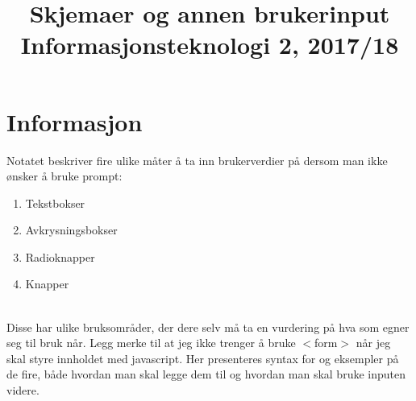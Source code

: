 \documentclass[a4paper, norsk, 10pt]{article}
\title{\bfseries \huge Skjemaer og annen brukerinput \\ Informasjonsteknologi 2, 2017/18}
\date{}
\author{}
\begin{document}
\thispagestyle{fancy}
\maketitle

\section*{Informasjon}
Notatet beskriver fire ulike måter å ta inn brukerverdier på dersom man ikke ønsker å bruke prompt:
\begin{enumerate}
\item Tekstbokser
\item Avkrysningsbokser
\item Radioknapper
\item Knapper
\end{enumerate} 
\ \\
Disse har ulike  bruksområder, der dere selv må ta en vurdering på hva som egner seg til bruk når. Legg merke til at jeg ikke trenger å bruke $<$form$>$ når jeg skal styre innholdet med javascript. Her presenteres syntax for og eksempler på de fire, både hvordan man skal legge dem til og hvordan man skal bruke inputen videre.\\
\ \\
\clearpage
\end{document}
